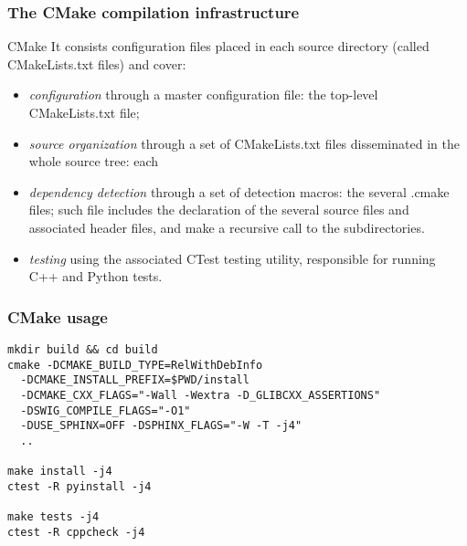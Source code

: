 \documentclass[8pt]{beamer}
\begin{document}
\begin{frame}
  \frametitle{The CMake compilation infrastructure}
  \begin{block}{CMake}
    It consists configuration files placed in each source directory (called CMakeLists.txt files) and cover:
    \begin{itemize}
    \item \emph{configuration} through a master configuration file: the top-level CMakeLists.txt file;
    \item \emph{source organization} through a set of CMakeLists.txt files disseminated in the whole source tree: each
    \item \emph{dependency detection} through a set of detection macros: the several .cmake files;
        such file includes the declaration of the several source files and associated header files, and make a recursive call to the subdirectories.
    \item \emph{testing} using the associated CTest testing utility, responsible for running C++ and Python tests.
    \end{itemize}
  \end{block}
\end{frame}

\begin{frame}[fragile]
  \frametitle{CMake usage}

  \lstset{style=mystyle}
  
\begin{lstlisting}
mkdir build && cd build
cmake -DCMAKE_BUILD_TYPE=RelWithDebInfo
  -DCMAKE_INSTALL_PREFIX=$PWD/install
  -DCMAKE_CXX_FLAGS="-Wall -Wextra -D_GLIBCXX_ASSERTIONS"
  -DSWIG_COMPILE_FLAGS="-O1"
  -DUSE_SPHINX=OFF -DSPHINX_FLAGS="-W -T -j4"
  ..

make install -j4
ctest -R pyinstall -j4

make tests -j4
ctest -R cppcheck -j4
\end{lstlisting}

\end{frame}

\end{document}
